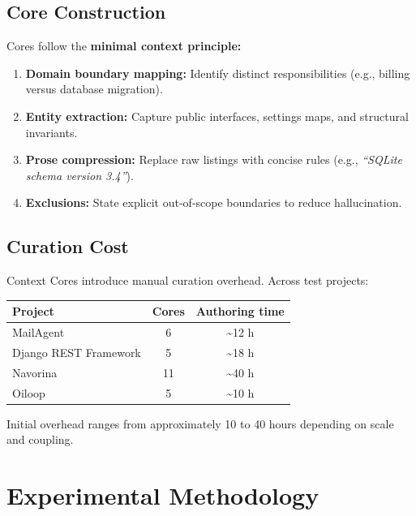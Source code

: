\documentclass[11pt]{article}
\newcounter{none}
\providecommand{\tightlist}{%
  \setlength{\itemsep}{2pt}%
  \setlength{\parskip}{0pt}%
}
\begin{document}
\subsection{Core Construction}\label{core-construction}

Cores follow the \textbf{minimal context principle:}

\begin{enumerate}
\def\labelenumi{\arabic{enumi}.}
\tightlist
\item
  \textbf{Domain boundary mapping:} Identify distinct responsibilities
  (e.g., billing versus database migration).
\item
  \textbf{Entity extraction:} Capture public interfaces, settings maps,
  and structural invariants.
\item
  \textbf{Prose compression:} Replace raw listings with concise rules
  (e.g., \emph{``SQLite schema version 3.4''}).
\item
  \textbf{Exclusions:} State explicit out-of-scope boundaries to reduce
  hallucination.
\end{enumerate}

\subsection{Curation Cost}\label{curation-cost}

Context Cores introduce manual curation overhead. Across test projects:

{\def\LTcaptype{none} %
\begin{longtable}[]{@{}lcc@{}}
\toprule\noalign{}
Project & Cores & Authoring time \\
\midrule\noalign{}
\endhead
\bottomrule\noalign{}
\endlastfoot
MailAgent & 6 & \textasciitilde12 h \\
Django REST Framework & 5 & \textasciitilde18 h \\
Navorina & 11 & \textasciitilde40 h \\
Oiloop & 5 & \textasciitilde10 h \\
\end{longtable}
}

Initial overhead ranges from approximately 10 to 40 hours depending on
scale and coupling.

\section{Experimental Methodology}\label{experimental-methodology}
\end{document}
